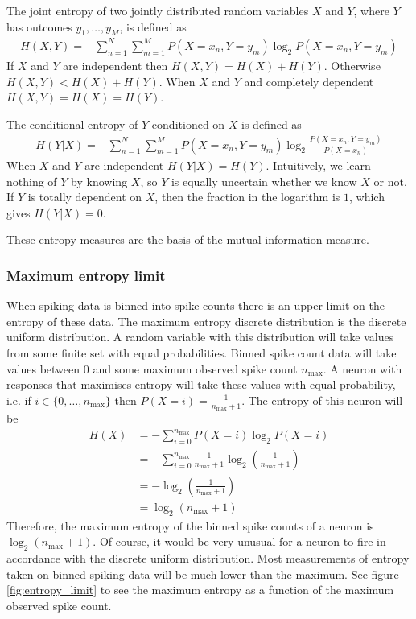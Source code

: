 \documentclass[a4paper,12pt]{article}
\theoremstyle{definition}
\begin{document}
        The joint entropy of two jointly distributed random variables $X$ and $Y$, where $Y$ has outcomes $y_1, \dots, y_M$, is defined as
        \begin{align}\label{joint_entropy}
        H(X, Y) = -\sum_{n=1}^N \sum_{m=1}^M P(X=x_n, Y=y_m) \log _2 P(X=x_n, Y=y_m)
        \end{align}
        If $X$ and $Y$ are independent then $H(X,Y) = H(X) + H(Y)$. Otherwise $H(X,Y) < H(X) + H(Y)$. When $X$ and $Y$ and completely dependent $H(X,Y) = H(X) = H(Y)$.

        The conditional entropy of $Y$ conditioned on $X$ is defined as
        \begin{align}
        H(Y|X) = -\sum_{n=1}^N \sum_{m=1}^M P(X=x_n, Y=y_m) \log _2 \frac{P(X=x_n, Y=y_m)}{P(X=x_n)}
        \end{align}
        When $X$ and $Y$ are independent $H(Y|X) = H(Y)$. Intuitively, we learn nothing of $Y$ by knowing $X$, so $Y$ is equally uncertain whether we know $X$ or not. If $Y$ is totally dependent on $X$, then the fraction in the logarithm is $1$, which gives $H(Y|X) = 0$.

        These entropy measures are the basis of the mutual information measure.

        \subsubsection{Maximum entropy limit}\label{sec:entropy_limit}
        When spiking data is binned into spike counts there is an upper limit on the entropy of these data. The maximum entropy discrete distribution is the discrete uniform distribution. A random variable with this distribution will take values from some finite set with equal probabilities. Binned spike count data will take values between $0$ and some maximum observed spike count $n_{\max}$. A neuron with responses that maximises entropy will take these values with equal probability, i.e. if $i \in \lbrace 0, \dots, n_{\max} \rbrace$ then $P(X = i) = \frac{1}{n_{\max} + 1}$. The entropy of this neuron will be
        \begin{align*}
          H(X)  &= - \sum_{i=0}^{n_{\max}} P(X = i) \log _2 P(X=i) \\
                &= - \sum_{i=0}^{n_{\max}} \frac{1}{n_{\max} + 1} \log_2 \left( \frac{1}{n_{\max} + 1} \right) \\
                &= - \log_2 \left( \frac{1}{n_{\max} + 1} \right) \\
                &= \log_2 \left( n_{\max} + 1 \right)
        \end{align*}
        Therefore, the maximum entropy of the binned spike counts of a neuron is $\log _2 \left( n_{\max} + 1 \right)$. Of course, it would be very unusual for a neuron to fire in accordance with the discrete uniform distribution. Most measurements of entropy taken on binned spiking data will be much lower than the maximum. See figure \ref{fig:entropy_limit} to see the maximum entropy as a function of the maximum observed spike count.
\end{document}
